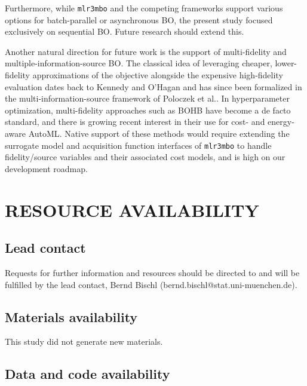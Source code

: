 \documentclass[12pt,letterpaper]{article}
\begin{document}
Furthermore, while \texttt{mlr3mbo} and the competing frameworks support various options for batch-parallel or asynchronous BO, the present study focused exclusively on sequential BO.
Future research should extend this.

Another natural direction for future work is the support of multi-fidelity and multiple-information-source BO.
The classical idea of leveraging cheaper, lower-fidelity approximations of the objective alongside the expensive high-fidelity evaluation dates back to Kennedy and O'Hagan\cite{kennedy2000} and has since been formalized in the multi-information-source framework of Poloczek et al.\cite{poloczek2017}.
In hyperparameter optimization, multi-fidelity approaches such as BOHB\cite{falkner2018} have become a de facto standard, and there is growing recent interest in their use for cost- and energy-aware AutoML\cite{candelieri2024}.
Native support of these methods would require extending the surrogate model and acquisition function interfaces of \texttt{mlr3mbo} to handle fidelity/source variables and their associated cost models, and is high on our development roadmap.





\newpage


\section*{RESOURCE AVAILABILITY}


\subsection*{Lead contact}


Requests for further information and resources should be directed to and will be fulfilled by the lead contact, Bernd Bischl (bernd.bischl@stat.uni-muenchen.de).

\subsection*{Materials availability}


This study did not generate new materials.

\subsection*{Data and code availability}
\end{document}
